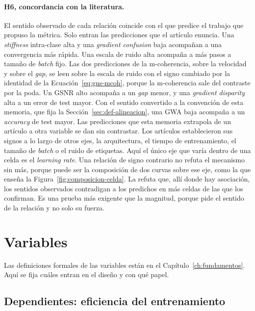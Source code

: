\paragraph{H6, concordancia con la literatura.} El sentido observado de cada relación coincide con el que predice el trabajo que propuso la métrica. Solo entran las predicciones que el artículo enuncia. Una \emph{stiffness} intra-clase alta y una \emph{gradient confusion} baja acompañan a una convergencia más rápida. Una escala de ruido alta acompaña a más pasos a tamaño de \emph{batch} fijo. Las dos predicciones de la m-coherencia, sobre la velocidad y sobre el \emph{gap}, se leen sobre la escala de ruido con el signo cambiado por la identidad de la Ecuación~\ref{eq:gns-mcoh}, porque la m-coherencia sale del contraste por la poda. Un GSNR alto acompaña a un \emph{gap} menor, y una \emph{gradient disparity} alta a un error de test mayor. Con el sentido convertido a la convención de esta memoria, que fija la Sección~\ref{sec:def-alineacion}, una GWA baja acompaña a un \emph{accuracy} de test mayor. Las predicciones que esta memoria extrapola de un artículo a otra variable se dan sin contrastar. Los artículos establecieron sus signos a lo largo de otros ejes, la arquitectura, el tiempo de entrenamiento, el tamaño de \emph{batch} o el ruido de etiquetas. Aquí el único eje que varía dentro de una celda es el \emph{learning rate}. Una relación de signo contrario no refuta el mecanismo sin más, porque puede ser la composición de dos curvas sobre ese eje, como la que enseña la Figura~\ref{fig:composicion-celda}. La refuta que, allí donde hay asociación, los sentidos observados contradigan a los predichos en más celdas de las que los confirman. Es una prueba más exigente que la magnitud, porque pide el sentido de la relación y no solo su fuerza.

\section{Variables}
\label{sec:variables}

Las definiciones formales de las variables están en el Capítulo~\ref{ch:fundamentos}. Aquí se fija cuáles entran en el diseño y con qué papel.

\subsection{Dependientes: eficiencia del entrenamiento}

